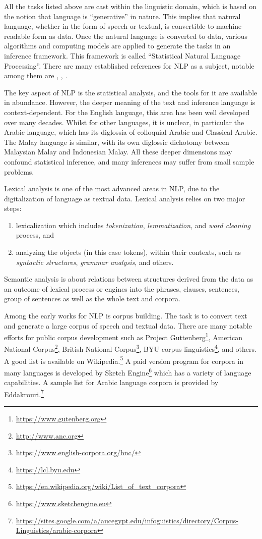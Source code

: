 \documentclass[
]{article}
\providecommand{\tightlist}{%
  \setlength{\itemsep}{0pt}\setlength{\parskip}{0pt}}
\begin{document}
All the tasks listed above are cast within the linguistic domain, which is based on the notion that language is ``generative'' in nature. This implies that natural language, whether in the form of speech or textual, is convertible to machine-readable form as data. Once the natural language is converted to data, various algorithms and computing models are applied to generate the tasks in an inference framework. This framework is called ``Statistical Natural Language Processing''. There are many established references for NLP as a subject, notable among them are \citet{manning1999}, \citet{manning2009}, \citet{jurafsky2000}.

The key aspect of NLP is the statistical analysis, and the tools for it are available in abundance. However, the deeper meaning of the text and inference language is context-dependent. For the English language, this area has been well developed over many decades. Whilst for other languages, it is unclear, in particular the Arabic language, which has its diglossia of colloquial Arabic and Classical Arabic. The Malay language is similar, with its own diglossic dichotomy between Malaysian Malay and Indonesian Malay. All these deeper dimensions may confound statistical inference, and many inferences may suffer from small sample problems.

Lexical analysis is one of the most advanced areas in NLP, due to the digitalization of language as textual data. Lexical analysis relies on two major steps:

\begin{enumerate}
\def\labelenumi{\alph{enumi})}
\tightlist
\item
  lexicalization which includes \emph{tokenization}, \emph{lemmatization}, and \emph{word cleaning} process, and
\item
  analyzing the objects (in this case tokens), within their contexts, such as \emph{syntactic structures}, \emph{grammar analysis}, and others.
\end{enumerate}

Semantic analysis is about relations between structures derived from the data as an outcome of lexical process or engines into the phrases, clauses, sentences, group of sentences as well as the whole text and corpora.

Among the early works for NLP is corpus building. The task is to convert text and generate a large corpus of speech and textual data. There are many notable efforts for public corpus development such as Project Guttenberg\footnote{\url{https://www.gutenberg.org}}, American National Corpus\footnote{\url{http://www.anc.org}}, British National Corpus\footnote{\url{https://www.english-corpora.org/bnc/}}, BYU corpus linguistics\footnote{\url{https://lcl.byu.edu}}, and others. A good list is available on Wikipedia.\footnote{\url{https://en.wikipedia.org/wiki/List_of_text_corpora}} A paid version program for corpora in many languages is developed by Sketch Engine\footnote{\url{https://www.sketchengine.eu}} which has a variety of language capabilities. A sample list for Arabic language corpora is provided by Eddakrouri.\footnote{\url{https://sites.google.com/a/aucegypt.edu/infoguistics/directory/Corpus-Linguistics/arabic-corpora}}
\end{document}
